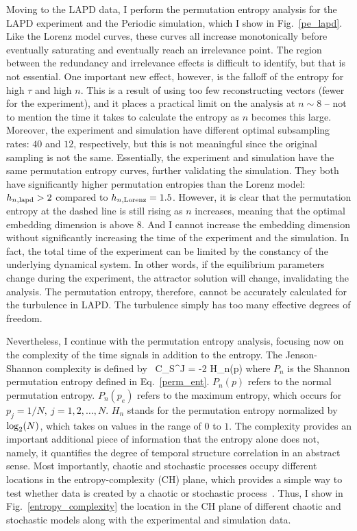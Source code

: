 Moving to the LAPD data, I perform the permutation entropy analysis for the LAPD experiment and the Periodic simulation, which I show in Fig.~\ref{pe_lapd}. Like the Lorenz model curves, these curves all
increase monotonically before eventually saturating and eventually reach an irrelevance point. The region between the redundancy and irrelevance effects is difficult to identify, 
but that is not essential.
One important new effect, however, is the falloff of the entropy for high $\tau$ and high $n$. This is a result of using too few reconstructing vectors (fewer for the experiment), 
and it places a practical limit on the analysis at $n \sim 8$ -- not to mention the time it takes to calculate the entropy as $n$ becomes this large.
Moreover, the experiment and simulation have different optimal subsampling rates: $40$ and $12$, respectively, but this is not meaningful since the original sampling is not the same. Essentially, the
experiment and simulation have the same permutation entropy curves, further validating the simulation. 
They both have significantly higher permutation entropies than the Lorenz model: $h_{n,{\rm{lapd}}} > 2$ compared to $h_{n,{\rm{Lorenz}}} = 1.5$. However, it is clear that the
permutation entropy at the dashed line is still rising as $n$ increases, meaning that the optimal embedding dimension is above $8$. And I cannot increase the embedding dimension without significantly
increasing the time of the experiment and the simulation. In fact, the total time of the experiment can be limited by the constancy of the underlying dynamical system. In other words, if the equilibrium
parameters change during the experiment, the attractor solution will change, invalidating the analysis.
The permutation entropy, therefore, cannot be accurately calculated for the turbulence in LAPD. The turbulence simply has too many effective degrees of freedom.

Nevertheless, I continue with the permutation entropy analysis, focusing now on the complexity of the time signals in addition to the entropy. The Jenson-Shannon complexity is 
defined by~\cite{rosso2007}
\beq
\label{csj}
C_S^J = -2  H_n(p)
\eeq
where $P_n$ is the Shannon permutation entropy defined in Eq.~\ref{perm_ent}. $P_n(p)$ refers to the normal permutation entropy. $P_n(p_e)$ refers to the maximum entropy, which occurs for
$p_j = 1/N, \ j=1,2,\ldots,N$. $H_n$ stands for the permutation entropy normalized by ${\rm{log}}_2(N)$, which takes on values in the range of $0$ to $1$. The complexity provides an important
additional piece of information that the entropy alone does not, namely, it quantifies the degree of temporal structure correlation in an abstract sense. 
Most importantly, chaotic and stochastic processes occupy
different locations in the entropy-complexity (CH) plane, which provides a simple way to test whether data is created by a chaotic or stochastic process~\cite{rosso2007}. Thus, I show in
Fig.~\ref{entropy_complexity} the location in the CH plane of different chaotic and stochastic models along with the experimental and simulation data.


